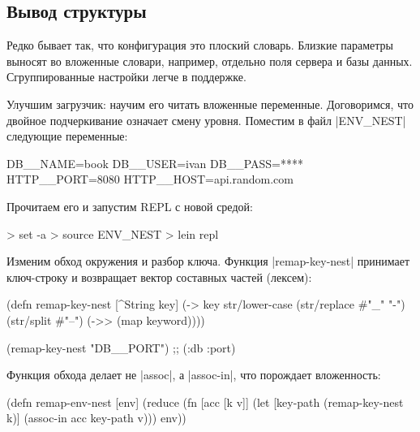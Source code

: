 \subsection{Вывод структуры}

Редко бывает так, что конфигурация это плоский словарь. Близкие параметры
выносят во вложенные словари, например, отдельно поля сервера и базы
данных. Сгруппированные настройки легче в поддержке.

Улучшим загрузчик: научим его читать вложенные переменные. Договоримся, что
двойное подчеркивание означает смену уровня. Поместим в файл \spverb|ENV_NEST|
следующие переменные:

\begin{english}
  \begin{bash}
DB__NAME=book
DB__USER=ivan
DB__PASS=****
HTTP__PORT=8080
HTTP__HOST=api.random.com
  \end{bash}
\end{english}

\noindent
Прочитаем его и запустим REPL с новой средой:

\begin{english}
  \begin{bash}
> set -a
> source ENV_NEST
> lein repl
  \end{bash}
\end{english}

Изменим обход окружения и разбор ключа. Функция \spverb|remap-key-nest|
принимает ключ-строку и возвращает вектор составных частей (лексем):

\begin{english}
  \begin{clojure}
(defn remap-key-nest
  [^String key]
  (-> key
      str/lower-case
      (str/replace #"_" "-")
      (str/split #"--")
      (->> (map keyword))))

(remap-key-nest "DB__PORT")
;; (:db :port)
  \end{clojure}
\end{english}

Функция обхода делает не \spverb|assoc|, а \spverb|assoc-in|, что порождает
вложенность:

\begin{english}
  \begin{clojure}
(defn remap-env-nest
  [env]
  (reduce
   (fn [acc [k v]]
     (let [key-path (remap-key-nest k)]
       (assoc-in acc key-path v)))
   {}
   env))
  \end{clojure}
\end{english}

